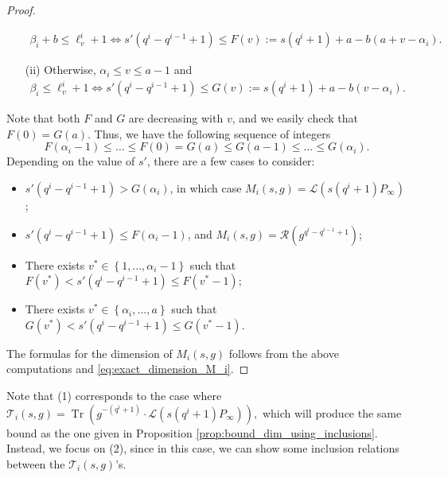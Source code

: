 \documentclass[a4paper]{amsart}
\theoremstyle{definition}
\theoremstyle{remark}
\DeclareMathOperator{\trace}{Tr}
\newcommand{\calL}{\mathcal{L}}
\newcommand{\calR}{\mathcal{R}}
\newcommand{\calT}{\mathcal{T}}
\newcommand{\Tr}[1]{\trace\!\left(#1\right)}
\newcommand{\set}[1]{\left\{#1\right\}}
\begin{document}
\begin{proof}
\begin{itemize}
\begin{align*}
        \beta_i+b \leq \ell_v^i +1 \iff s'(q^i-q^{i-1}+1) \leq F(v) := s(q^i+1)+a-b(a+v-\alpha_i).
    \end{align*}
    \item[(ii)] Otherwise, $\alpha_i \leq v \leq a-1$ and
    \begin{align*}
        \beta_i \leq \ell_v^i +1 \iff s'(q^i-q^{i-1}+1) \leq G(v) := s(q^i+1)+a-b(v-\alpha_i).
    \end{align*}
\end{itemize}
Note that both $F$ and $G$ are decreasing with $v$, and we easily check that $F(0) = G(a)$. Thus, we have the following sequence of integers
$$F(\alpha_i-1) \leq \dots \leq F(0) = G(a) \leq G(a-1) \leq \dots \leq G(\alpha_i).$$
Depending on the value of $s'$, there are a few cases  to consider:
\begin{itemize}
    \item $s'(q^i-q^{i-1}+1) >G(\alpha_i)$, in which case $M_i(s,g) = \calL(s(q^i+1)P_\infty)$;
    \item $s'(q^i-q^{i-1}+1) \leq F(\alpha_i-1)$, and $M_i(s,g) = \calR(g^{q^i-q^{i-1}+1})$;
    \item There exists $v^* \in \set{1,...,\alpha_i-1}$ such that $F(v^*) < s'(q^i-q^{i-1}+1) \leq F(v^*-1)$;
    \item There exists $v^* \in \set{\alpha_i,...,a}$ such that $G(v^*) < s'(q^i-q^{i-1}+1) \leq G(v^*-1)$.
\end{itemize}
The formulas for the dimension of $M_i(s,g)$ follows from the above computations and \eqref{eq:exact_dimension_M_i}.
\end{proof}

Note that (1) corresponds to the case where $\calT_i(s,g) = \Tr{g^{-(q^i+1)}\cdot \calL(s(q^i+1)P_\infty)}, $ which will produce the same bound as the one given in Proposition \ref{prop:bound_dim_using_inclusions}.
Instead, we focus on (2), since in this case, we can show some inclusion relations between the $\calT_i(s,g)$'s.
\end{document}
